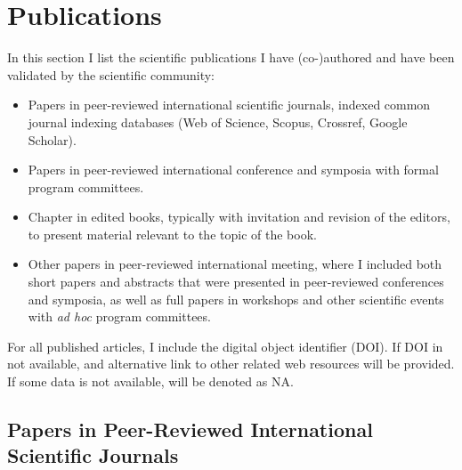 \section{Publications}\label{publications}

In this section I list the scientific publications I have (co-)authored
and have been validated by the scientific community:

\begin{itemize}
\item
  Papers in peer-reviewed international scientific journals, indexed
  common journal indexing databases (Web of Science, Scopus, Crossref,
  Google Scholar).
\item
  Papers in peer-reviewed international conference and symposia with
  formal program committees.
\item
  Chapter in edited books, typically with invitation and revision of the
  editors, to present material relevant to the topic of the book.
\item
  Other papers in peer-reviewed international meeting, where I included
  both short papers and abstracts that were presented in peer-reviewed
  conferences and symposia, as well as full papers in workshops and
  other scientific events with \emph{ad hoc} program committees.
\end{itemize}

For all published articles, I include the digital object identifier
(DOI). If DOI in not available, and alternative link to other related
web resources will be provided. If some data is not available, will be
denoted as NA.

\subsection{Papers in Peer-Reviewed International Scientific
Journals}\label{papers-in-peer-reviewed-international-scientific-journals}

